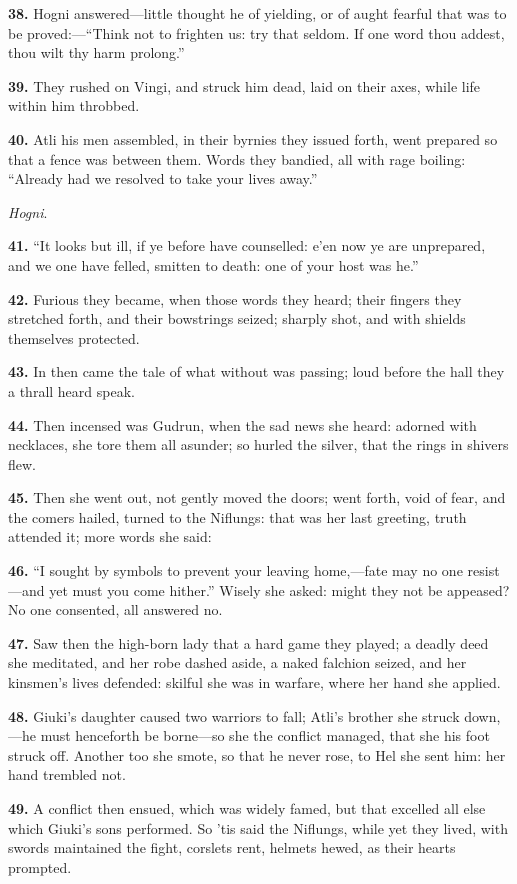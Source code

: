 \textbf{38.} Hogni answered—little thought he of yielding, or of aught
fearful that was to be proved:—``Think not to frighten us: try that
seldom. If one word thou addest, thou wilt thy harm prolong.''

\textbf{39.} They rushed on Vingi, and struck him dead, laid on their axes,
while life within him throbbed.

\textbf{40.} Atli his men assembled, in their byrnies they issued forth, went
prepared so that a fence was between them. Words they bandied, all
with rage boiling: ``Already had we resolved to take your lives away.''

\emph{Hogni}.

\textbf{41.} ``It looks but ill, if ye before have counselled: e'en now ye are
unprepared, and we one have felled, smitten to death: one of your host
was he.''

\textbf{42.} Furious they became, when those words they heard; their fingers
they stretched forth, and their bowstrings seized; sharply shot, and
with shields themselves protected.

\textbf{43.} In then came the tale of what without was passing; loud before
the hall they a thrall heard speak.

\textbf{44.} Then incensed was Gudrun, when the sad news she heard: adorned
with necklaces, she tore them all asunder; so hurled the silver, that
the rings in shivers flew.

\textbf{45.} Then she went out, not gently moved the doors; went forth, void
of fear, and the comers hailed, turned to the Niflungs: that was her
last greeting, truth attended it; more words she said:

\textbf{46.} ``I sought by symbols to prevent your leaving home,—fate may no
one resist—and yet must you come hither.'' Wisely she asked: might
they not be appeased? No one consented, all answered no.

\textbf{47.} Saw then the high-born lady that a hard game they played; a
deadly deed she meditated, and her robe dashed aside, a naked falchion
seized, and her kinsmen's lives defended: skilful she was in warfare,
where her hand she applied.

\textbf{48.} Giuki's daughter caused two warriors to fall; Atli's brother she
struck down,—he must henceforth be borne—so she the conflict
managed, that she his foot struck off. Another too she smote, so that
he never rose, to Hel she sent him: her hand trembled not.

\textbf{49.} A conflict then ensued, which was widely famed, but that
excelled all else which Giuki's sons performed. So 'tis said the
Niflungs, while yet they lived, with swords maintained the fight,
corslets rent, helmets hewed, as their hearts prompted.

